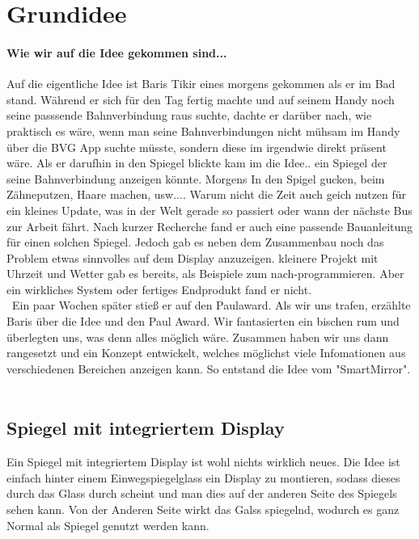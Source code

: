 \section{Grundidee}
\paragraph{Wie wir auf die Idee gekommen sind...}
Auf die eigentliche Idee ist Baris Tikir eines morgens gekommen als er im Bad stand. Während er sich für den Tag fertig machte und auf seinem Handy noch seine passsende Bahnverbindung raus suchte, dachte er darüber nach, wie praktisch es wäre, wenn man seine Bahnverbindungen nicht mühsam im Handy über die BVG App suchte müsste, sondern diese im irgendwie direkt präsent wäre. Als er darufhin in den Spiegel blickte kam im die Idee.. ein Spiegel  der seine Bahnverbindung anzeigen könnte. Morgens In den Spigel gucken, beim Zähneputzen, Haare machen, usw.... Warum nicht die Zeit auch geich nutzen für ein kleines Update, was in der Welt gerade so passiert oder wann der nächste Bus zur Arbeit fährt. Nach kurzer Recherche fand er auch eine passende Bauanleitung für einen solchen Spiegel. Jedoch gab es neben dem Zusammenbau noch das Problem etwas  sinnvolles auf dem Display anzuzeigen. kleinere Projekt mit Uhrzeit und Wetter gab es bereits, als Beispiele zum nach-programmieren. Aber ein wirkliches System oder fertiges Endprodukt fand er nicht.
\\\
Ein paar Wochen später stieß er auf den Paulaward. Als wir uns trafen, erzählte Baris über die Idee und den Paul Award. Wir fantasierten ein bischen rum und überlegten uns, was denn alles möglich wäre. Zusammen haben wir uns dann rangesetzt und ein Konzept entwickelt, welches möglichst viele Infomationen aus verschiedenen Bereichen anzeigen kann. So entstand die Idee vom "SmartMirror".\\\

\subsection{Spiegel mit integriertem Display}
Ein Spiegel mit integriertem Display ist wohl nichts wirklich neues. Die Idee ist einfach hinter einem Einwegspiegelglass ein Display zu montieren, sodass dieses durch das Glass durch scheint und man dies auf der anderen Seite des Spiegels sehen kann. Von der Anderen Seite wirkt das Galss spiegelnd, wodurch es ganz Normal als Spiegel genutzt werden kann.
